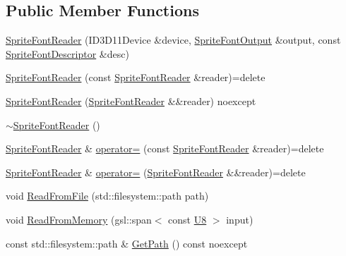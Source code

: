 \subsection*{Public Member Functions}
\begin{DoxyCompactItemize}
\item 
\mbox{\hyperlink{classmage_1_1rendering_1_1loader_1_1_sprite_font_reader_a5cef04ca33ef0047664fa757de6e1b8f}{Sprite\+Font\+Reader}} (I\+D3\+D11\+Device \&device, \mbox{\hyperlink{structmage_1_1rendering_1_1_sprite_font_output}{Sprite\+Font\+Output}} \&output, const \mbox{\hyperlink{classmage_1_1rendering_1_1_sprite_font_descriptor}{Sprite\+Font\+Descriptor}} \&desc)
\item 
\mbox{\hyperlink{classmage_1_1rendering_1_1loader_1_1_sprite_font_reader_a4c96a8d3554084baaf4b24f94a582ac6}{Sprite\+Font\+Reader}} (const \mbox{\hyperlink{classmage_1_1rendering_1_1loader_1_1_sprite_font_reader}{Sprite\+Font\+Reader}} \&reader)=delete
\item 
\mbox{\hyperlink{classmage_1_1rendering_1_1loader_1_1_sprite_font_reader_a71239906b4c7609747d5fe47189883b6}{Sprite\+Font\+Reader}} (\mbox{\hyperlink{classmage_1_1rendering_1_1loader_1_1_sprite_font_reader}{Sprite\+Font\+Reader}} \&\&reader) noexcept
\item 
\mbox{\hyperlink{classmage_1_1rendering_1_1loader_1_1_sprite_font_reader_a206d696476cd2ed6606932c549cd0c6c}{$\sim$\+Sprite\+Font\+Reader}} ()
\item 
\mbox{\hyperlink{classmage_1_1rendering_1_1loader_1_1_sprite_font_reader}{Sprite\+Font\+Reader}} \& \mbox{\hyperlink{classmage_1_1rendering_1_1loader_1_1_sprite_font_reader_a645988b6bba2a4fda93d18c4c9e3d09c}{operator=}} (const \mbox{\hyperlink{classmage_1_1rendering_1_1loader_1_1_sprite_font_reader}{Sprite\+Font\+Reader}} \&reader)=delete
\item 
\mbox{\hyperlink{classmage_1_1rendering_1_1loader_1_1_sprite_font_reader}{Sprite\+Font\+Reader}} \& \mbox{\hyperlink{classmage_1_1rendering_1_1loader_1_1_sprite_font_reader_ac6902b3475ae8425d475de59135a11a3}{operator=}} (\mbox{\hyperlink{classmage_1_1rendering_1_1loader_1_1_sprite_font_reader}{Sprite\+Font\+Reader}} \&\&reader)=delete
\item 
void \mbox{\hyperlink{classmage_1_1rendering_1_1loader_1_1_sprite_font_reader_a0308b90e3cf888d383a228cfe8827972}{Read\+From\+File}} (std\+::filesystem\+::path path)
\item 
void \mbox{\hyperlink{classmage_1_1rendering_1_1loader_1_1_sprite_font_reader_afc48490dca5042078726a1ec3fe7abe7}{Read\+From\+Memory}} (gsl\+::span$<$ const \mbox{\hyperlink{namespacemage_afc638980bc6154f15af5e2d93a0e0ea9}{U8}} $>$ input)
\item 
const std\+::filesystem\+::path \& \mbox{\hyperlink{classmage_1_1rendering_1_1loader_1_1_sprite_font_reader_a1d21e0117af4cbf99152e4a659372364}{Get\+Path}} () const noexcept
\end{DoxyCompactItemize}
